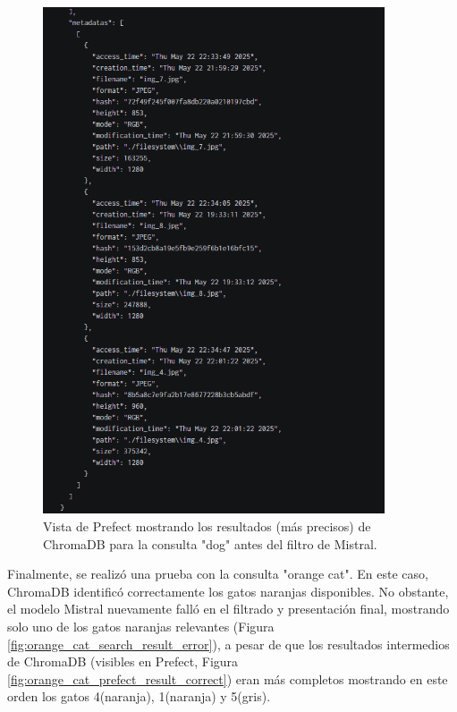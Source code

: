 \begin{figure}[H]
\centering
\includegraphics[width=0.9\textwidth]{archivos/dogs_prefect_result.png}
\caption[Resultados de ChromaDB para "dog" en Prefect]{Vista de Prefect mostrando los resultados (más precisos) de ChromaDB para la consulta "dog" antes del filtro de Mistral.}
\label{fig:dogs_prefect_results_correct}
\end{figure}

Finalmente, se realizó una prueba con la consulta "orange cat". En este caso, ChromaDB identificó correctamente los gatos naranjas disponibles. No obstante, el modelo Mistral nuevamente falló en el filtrado y presentación final, mostrando solo uno de los gatos naranjas relevantes (Figura \ref{fig:orange_cat_search_result_error}), a pesar de que los resultados intermedios de ChromaDB (visibles en Prefect, Figura \ref{fig:orange_cat_prefect_result_correct}) eran más completos mostrando en este orden los gatos 4(naranja), 1(naranja) y 5(gris).


